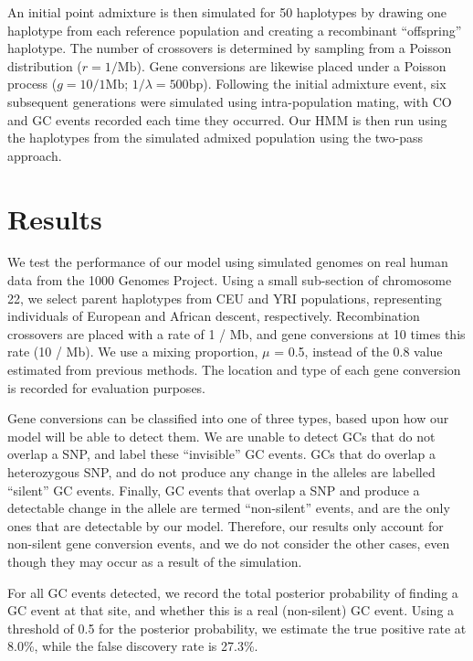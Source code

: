 An initial point admixture is then simulated for 50 haplotypes by drawing one haplotype from each reference population and creating a recombinant ``offspring'' haplotype.
The number of crossovers is determined by sampling from a Poisson distribution ($r = 1 / \mathrm{Mb}$).
Gene conversions are likewise placed under a Poisson process ($g = 10/1 \mathrm{Mb}$; $1/\lambda = 500 \mathrm{bp}$).
Following the initial admixture event, six subsequent generations were simulated using intra-population mating, with CO and GC events recorded each time they occurred. 
Our HMM is then run using the haplotypes from the simulated admixed population using the two-pass approach.


\section{Results}


We test the performance of our model using simulated genomes on real human data from the 1000 Genomes Project\cite{1000G2015}.
Using a small sub-section of chromosome 22, we select parent haplotypes from CEU and YRI populations, representing individuals of European and African descent, respectively.
Recombination crossovers are placed with a rate of 1 / Mb, and gene conversions at 10 times this rate (10 / Mb).
We use a mixing proportion, $\mu$ = 0.5, instead of the 0.8 value estimated from previous methods\cite{Price2009}.
The location and type of each gene conversion is recorded for evaluation purposes.

Gene conversions can be classified into one of three types, based upon how our model will be able to detect them.
We are unable to detect GCs that do not overlap a SNP, and label these ``invisible'' GC events.
GCs that do overlap a heterozygous SNP, and do not produce any change in the alleles are labelled ``silent'' GC events.
Finally, GC events that overlap a SNP and produce a detectable change in the allele are termed ``non-silent'' events, and are the only ones that are detectable by our model.
Therefore, our results only account for non-silent gene conversion events, and we do not consider the other cases, even though they may occur as a result of the simulation.


For all GC events detected, we record the total posterior probability of finding a GC event at that site, and whether this is a real (non-silent) GC event.
Using a threshold of 0.5 for the posterior probability, we estimate the true positive rate at 8.0\%, while the false discovery rate is 27.3\%. %


